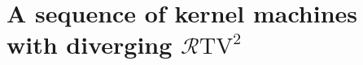 \section{A sequence of kernel machines with diverging $\mathcal{R}\mathrm{TV}^2$}\label{sec: diverge}
    
    
    
    
    
    
